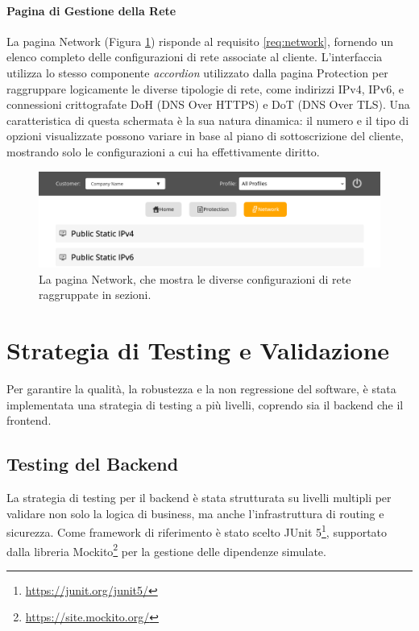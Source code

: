 \documentclass[12pt,a4paper,openright,twoside]{book}
\begin{document}
\FloatBarrier


\paragraph{Pagina di Gestione della Rete}
La pagina Network (Figura \ref{fig:network_page}) risponde al requisito \ref{req:network}, fornendo un elenco completo delle configurazioni di rete associate al cliente. L'interfaccia utilizza lo stesso componente \textit{accordion} utilizzato dalla pagina Protection per raggruppare logicamente le diverse tipologie di rete, come indirizzi IPv4, IPv6, e connessioni crittografate DoH (DNS Over HTTPS) e DoT (DNS Over TLS). Una caratteristica di questa schermata è la sua natura dinamica: il numero e il tipo di opzioni visualizzate possono variare in base al piano di sottoscrizione del cliente, mostrando solo le configurazioni a cui ha effettivamente diritto.

\begin{figure}[htbp]
    \centering
    \includegraphics[width=\textwidth]{figures/network.png}
    \caption{La pagina Network, che mostra le diverse configurazioni di rete raggruppate in sezioni.}
    \label{fig:network_page}
\end{figure}

\FloatBarrier

\section{Strategia di Testing e Validazione}
\label{sec:testing}
Per garantire la qualità, la robustezza e la non regressione del software, è stata implementata una strategia di testing a più livelli, coprendo sia il backend che il frontend.

\subsection{Testing del Backend}

La strategia di testing per il backend è stata strutturata su livelli multipli per validare non solo la logica di business, ma anche l'infrastruttura di routing e sicurezza. Come framework di riferimento è stato scelto JUnit 5\footnote{\url{https://junit.org/junit5/}}, supportato dalla libreria Mockito\footnote{\url{https://site.mockito.org/}} per la gestione delle dipendenze simulate.
\end{document}
